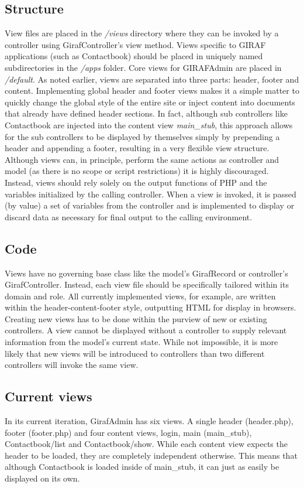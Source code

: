 \subsection{Structure}
View files are placed in the \emph{/views} directory where they can be invoked by a controller using GirafController's view method. Views specific to GIRAF applications (such as Contactbook) should be placed in uniquely named subdirectories in the \emph{/apps} folder. Core views for GIRAFAdmin are placed in \emph{/default}.
As noted earlier, views are separated into three parts: header, footer and content. Implementing global header and footer views makes it a simple matter to quickly change the global style of the entire site or inject content into documents that already have defined header sections. In fact, although sub controllers like Contactbook are injected into the content view \emph{main\_stub}, this approach allows for the sub controllers to be displayed by themselves simply by prepending a header and appending a footer, resulting in a very flexible view structure.
Although views can, in principle, perform the same actions as controller and model (as there is no scope or script restrictions) it is highly discouraged. Instead, views should rely solely on the output functions of PHP and the variables initialized by the calling controller. When a view is invoked, it is passed (by value) a set of variables from the controller and is implemented to display or discard data as necessary for final output to the calling environment.

\subsection{Code}
Views have no governing base class like the model's GirafRecord or controller's GirafController. Instead, each view file should be specifically tailored within its domain and role. All currently implemented views, for example, are written within the header-content-footer style, outputting HTML for display in browsers.
Creating new views has to be done within the purview of new or existing controllers. A view cannot be displayed without a controller to supply relevant information from the model's current state. While not impossible, it is more likely that new views will be introduced to controllers than two different controllers will invoke the same view.

\subsection{Current views}
In its current iteration, GirafAdmin has six views. A single header (header.php), footer (footer.php) and four content views, login, main (main\_stub), Contactbook/list and Contactbook/show. While each content view expects the header to be loaded, they are completely independent otherwise. This means that although Contactbook is loaded inside of main\_stub, it can just as easily be displayed on its own.